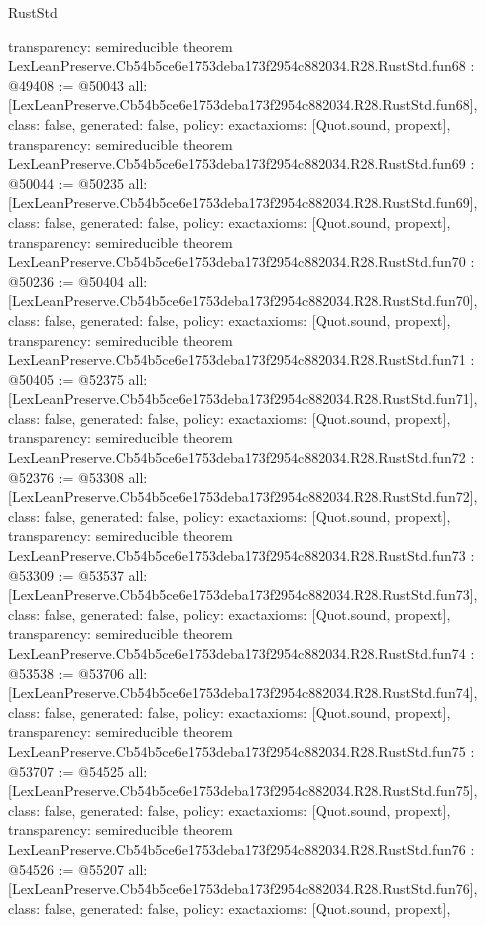 \begin{lexlean}{RustStd}
\begin{coremodule}
{  transparency: semireducible
}
theorem LexLeanPreserve.Cb54b5ce6e1753deba173f2954c882034.R28.RustStd.fun68 : @49408 := @50043 {
  all: [LexLeanPreserve.Cb54b5ce6e1753deba173f2954c882034.R28.RustStd.fun68],
  class: false,
  generated: false,
  policy: exact{axioms: [Quot.sound, propext]},
  transparency: semireducible
}
theorem LexLeanPreserve.Cb54b5ce6e1753deba173f2954c882034.R28.RustStd.fun69 : @50044 := @50235 {
  all: [LexLeanPreserve.Cb54b5ce6e1753deba173f2954c882034.R28.RustStd.fun69],
  class: false,
  generated: false,
  policy: exact{axioms: [Quot.sound, propext]},
  transparency: semireducible
}
theorem LexLeanPreserve.Cb54b5ce6e1753deba173f2954c882034.R28.RustStd.fun70 : @50236 := @50404 {
  all: [LexLeanPreserve.Cb54b5ce6e1753deba173f2954c882034.R28.RustStd.fun70],
  class: false,
  generated: false,
  policy: exact{axioms: [Quot.sound, propext]},
  transparency: semireducible
}
theorem LexLeanPreserve.Cb54b5ce6e1753deba173f2954c882034.R28.RustStd.fun71 : @50405 := @52375 {
  all: [LexLeanPreserve.Cb54b5ce6e1753deba173f2954c882034.R28.RustStd.fun71],
  class: false,
  generated: false,
  policy: exact{axioms: [Quot.sound, propext]},
  transparency: semireducible
}
theorem LexLeanPreserve.Cb54b5ce6e1753deba173f2954c882034.R28.RustStd.fun72 : @52376 := @53308 {
  all: [LexLeanPreserve.Cb54b5ce6e1753deba173f2954c882034.R28.RustStd.fun72],
  class: false,
  generated: false,
  policy: exact{axioms: [Quot.sound, propext]},
  transparency: semireducible
}
theorem LexLeanPreserve.Cb54b5ce6e1753deba173f2954c882034.R28.RustStd.fun73 : @53309 := @53537 {
  all: [LexLeanPreserve.Cb54b5ce6e1753deba173f2954c882034.R28.RustStd.fun73],
  class: false,
  generated: false,
  policy: exact{axioms: [Quot.sound, propext]},
  transparency: semireducible
}
theorem LexLeanPreserve.Cb54b5ce6e1753deba173f2954c882034.R28.RustStd.fun74 : @53538 := @53706 {
  all: [LexLeanPreserve.Cb54b5ce6e1753deba173f2954c882034.R28.RustStd.fun74],
  class: false,
  generated: false,
  policy: exact{axioms: [Quot.sound, propext]},
  transparency: semireducible
}
theorem LexLeanPreserve.Cb54b5ce6e1753deba173f2954c882034.R28.RustStd.fun75 : @53707 := @54525 {
  all: [LexLeanPreserve.Cb54b5ce6e1753deba173f2954c882034.R28.RustStd.fun75],
  class: false,
  generated: false,
  policy: exact{axioms: [Quot.sound, propext]},
  transparency: semireducible
}
theorem LexLeanPreserve.Cb54b5ce6e1753deba173f2954c882034.R28.RustStd.fun76 : @54526 := @55207 {
  all: [LexLeanPreserve.Cb54b5ce6e1753deba173f2954c882034.R28.RustStd.fun76],
  class: false,
  generated: false,
  policy: exact{axioms: [Quot.sound, propext]},
}
\end{coremodule}
\end{lexlean}
